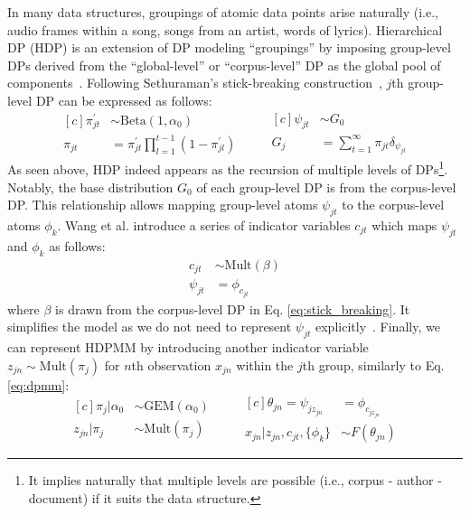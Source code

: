 \documentclass{article}
\begin{document}
In many data structures, groupings of atomic data points arise naturally (i.e., audio frames within a song, songs from an artist, words of lyrics). Hierarchical DP (HDP) is an extension of DP modeling ``groupings'' by imposing group-level DPs derived from the ``global-level'' or ``corpus-level'' DP as the global pool of components~\cite{doi:10.1198/016214506000000302}. Following Sethuraman's stick-breaking construction~\cite{DBLP:journals/jmlr/WangPB11}, $j$th group-level DP can be expressed as follows:
\begin{equation}\label{eq:hdp_doc_level}
\begin{aligned}[c]
    \pi^{\prime}_{jt} &\sim \text{Beta}(1, \alpha_{0}) \\
    \pi_{jt} &= \pi^{\prime}_{jt} \prod^{t - 1}_{l = 1} (1 - \pi^{\prime}_{jl})
\end{aligned}
\qquad
\begin{aligned}[c]
    \psi_{jt} &\sim G_{0} \\
    G_{j} &= \sum^{\infty}_{t = 1} \pi_{jt}\delta_{\psi_{jt}}
\end{aligned}
\end{equation}
As seen above, HDP indeed appears as the recursion of multiple levels of DPs\footnote{It implies naturally that multiple levels are possible (i.e., corpus - author - document) if it suits the data structure.}. Notably, the base distribution $G_{0}$ of each group-level DP is from the corpus-level DP. This relationship allows mapping group-level atoms $\psi_{jt}$ to the corpus-level atoms $\phi_{k}$. Wang et al. introduce a series of indicator variables $c_{jt}$ which maps $\psi_{jt}$ and $\phi_{k}$ as follows\cite{DBLP:journals/jmlr/WangPB11}:
\begin{equation}\label{eq:psi2phi}
\begin{aligned}
    c_{jt} &\sim \text{Mult}(\beta) \\
    \psi_{jt} &= \phi_{c_{jt}}
\end{aligned}
\end{equation}
where $\beta$ is drawn from the corpus-level DP in Eq. \ref{eq:stick_breaking}. It simplifies the model as we do not need to represent $\psi_{jt}$ explicitly~\cite{DBLP:journals/jmlr/WangPB11}.
Finally, we can represent HDPMM by introducing another indicator variable $z_{jn} \sim \text{Mult}(\pi_{j})$ for $n$th observation $x_{jn}$ within the $j$th group, similarly to Eq. \ref{eq:dpmm}:
\begin{equation}\label{eq:hdpmm}
\begin{aligned}[c]
    \pi_{j}|\alpha_{0} &\sim \text{GEM}(\alpha_{0}) \\
    z_{jn}|\pi_{j} &\sim \text{Mult}(\pi_{j})
\end{aligned}
\qquad
\begin{aligned}[c]
    \theta_{jn} = \psi_{jz_{jn}} &= \phi_{c_{jz_{jn}}}  \\
    x_{jn}|z_{jn}, c_{jt}, \{\phi_{k}\} &\sim F(\theta_{jn}) 
\end{aligned}
\end{equation}
\end{document}
